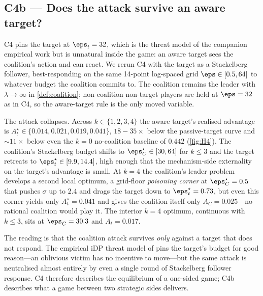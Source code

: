 \subsection{C4b --- Does the attack survive an aware target?}
\label{sec:C4b}

C4 pins the target at $\eps_t = 32$, which is the threat model of the
companion empirical work but is unnatural inside the game: an aware
target sees the coalition's action and can react. We rerun C4 with the
target as a Stackelberg follower, best-responding on the same 14-point
log-spaced grid $\eps \in [0.5, 64]$ to whatever budget the coalition
commits to. The coalition remains the leader with $\lambda \to \infty$
in \cref{def:coalition}; non-coalition non-target players are held at
$\eps = 32$ as in C4, so the aware-target rule is the only moved
variable.

The attack collapses. Across $k \in \{1, 2, 3, 4\}$ the aware target's
realised advantage is $A_t^\star \in \{0.014, 0.021, 0.019, 0.041\}$,
$18{-}35\times$ below the passive-target curve and $\sim$$11\times$
below even the $k{=}0$ no-coalition baseline of $0.442$
(\cref{fig:H4}). The coalition's Stackelberg budget shifts to
$\eps_C^\star \in [30, 64]$ for $k \le 3$ and the target retreats to
$\eps_t^\star \in [9.9, 14.4]$, high enough that the mechanism-side
externality on the target's advantage is small. At $k = 4$ the
coalition's leader problem develops a second local optimum, a
grid-floor \emph{poisoning corner} at $\eps_C^\star = 0.5$ that pushes
$\sigma$ up to $2.4$ and drags the target down to
$\eps_t^\star = 0.73$, but even this corner yields only
$A_t^\star = 0.041$ and gives the coalition itself only
$A_C = 0.025$---no rational coalition would play it. The interior
$k = 4$ optimum, continuous with $k \le 3$, sits at
$\eps_C = 30.3$ and $A_t = 0.017$.

The reading is that the coalition attack survives \emph{only} against a
target that does not respond. The empirical iDP threat model of
\citet{kaiser2026your} pins the target's budget for good reason---an
oblivious victim has no incentive to move---but the same attack is
neutralised almost entirely by even a single round of Stackelberg
follower response. C4 therefore describes the equilibrium of a
one-sided game; C4b describes what a game between two strategic sides
delivers.

